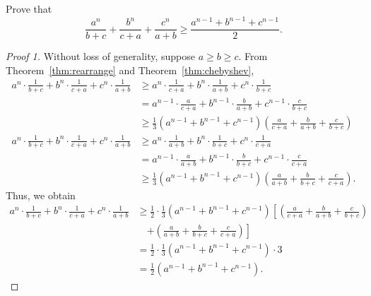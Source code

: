 \documentclass[../main.tex]{subfiles}
\begin{document}
\begin{exercise}
    Prove that
    \[
        \frac{a^n}{b + c} + \frac{b^n}{c + a} + \frac{c^n}{a + b} \geq \frac{a^{n-1} + b^{n-1} + c^{n-1}}{2}.
    \]
\end{exercise}
\begin{proof}[Proof 1]
    Without loss of generality, suppose $a \geq b \geq c$.
    From Theorem~\ref{thm:rearrange} and Theorem~\ref{thm:chebyshev}, 
    \begin{align*}
        a^{n} \cdot \frac{1}{b+c} + b^{n} \cdot \frac{1}{c+a} + c^{n} \cdot \frac{1}{a+b} &\geq a^n \cdot \frac{1}{c+a} + b^n \cdot \frac{1}{a+b} + c^n \cdot \frac{1}{b+c}\\
                                                                                          &= a^{n-1} \cdot \frac{a}{c+a} + b^{n-1} \cdot \frac{b}{a+b} + c^{n-1} \cdot \frac{c}{b+c} \\
                                                                                          &\geq \frac 1 3 \left(a^{n-1} + b^{n-1} + c^{n-1}\right) \left(\frac{a}{c+a} + \frac{b}{a+b} + \frac{c}{b+c}\right)\\
        a^{n} \cdot \frac{1}{b+c} + b^{n} \cdot \frac{1}{c+a} + c^{n} \cdot \frac{1}{a+b} &\geq a^n \cdot \frac{1}{a+b} + b^n \cdot \frac{1}{b+c} + c^n \cdot \frac{1}{c+a}\\
                                                                                          &= a^{n-1} \cdot \frac{a}{a+b} + b^{n-1} \cdot \frac{b}{b+c} + c^{n-1} \cdot \frac{c}{c+a} \\
                                                                                          &\geq \frac 1 3 \left(a^{n-1} + b^{n-1} + c^{n-1}\right) \left(\frac{a}{a+b} + \frac{b}{b+c} + \frac{c}{c+a}\right).
    \end{align*}
    Thus, we obtain
    \begin{align*}
        a^{n} \cdot \frac{1}{b+c} + b^{n} \cdot \frac{1}{c+a} + c^{n} \cdot \frac{1}{a+b} &\geq \frac 1 2 \cdot \frac 1 3 \left(a^{n-1} + b^{n-1} + c^{n-1}\right) \left[\left(\frac{a}{c+a} + \frac{b}{a+b} + \frac{c}{b+c}\right)\right. \\
                                                                                          &\quad \left.+ \left(\frac{a}{a+b} + \frac{b}{b+c} + \frac{c}{c+a}\right)\right]\\
                                                                                          &= \frac 1 2 \cdot \frac 1 3 \left(a^{n-1} + b^{n-1} + c^{n-1}\right) \cdot 3\\
                                                                                          &= \frac 1 2 \left(a^{n-1} + b^{n-1} + c^{n-1}\right).
    \end{align*}
\end{proof}
\end{document}
